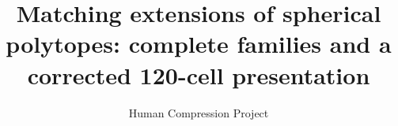 
\title{Matching extensions of spherical polytopes: complete families and a corrected 120-cell presentation}
\author{Human Compression Project}
\date{}

\maketitle


